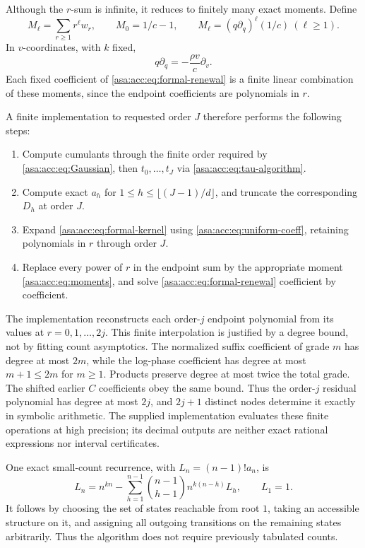 \documentclass[11pt,letterpaper]{article}
\theoremstyle{remark}\newtheorem{remark}[theorem]{Remark}
\numberwithin{equation}{section}
\begin{document}
Although the $r$-sum is infinite, it reduces to finitely many exact moments. Define
\begin{equation}\label{asa:acc:eq:moments}
M_\ell=\sum_{r\ge1}r^\ell w_r,\qquad
M_0=1/c-1,\qquad M_\ell=(q\partial_q)^\ell(1/c)\ (\ell\ge1).
\end{equation}
In $v$-coordinates, with $k$ fixed,
\begin{equation}\label{asa:acc:eq:moment-D}
q\partial_q=-\frac{\rho v}{c}\partial_v.
\end{equation}
Each fixed coefficient of \eqref{asa:acc:eq:formal-renewal} is a finite linear combination of these moments, since the endpoint coefficients are polynomials in $r$.

A finite implementation to requested order $J$ therefore performs the following steps:
\begin{enumerate}
\item Compute cumulants through the finite order required by \eqref{asa:acc:eq:Gaussian}, then $t_0,\ldots,t_J$ via \eqref{asa:acc:eq:tau-algorithm}.
\item Compute exact $a_h$ for $1\le h\le\lfloor(J-1)/d\rfloor$, and truncate the corresponding $D_h$ at order $J$.
\item Expand \eqref{asa:acc:eq:formal-kernel} using \eqref{asa:acc:eq:uniform-coeff}, retaining polynomials in $r$ through order $J$.
\item Replace every power of $r$ in the endpoint sum by the appropriate moment \eqref{asa:acc:eq:moments}, and solve \eqref{asa:acc:eq:formal-renewal} coefficient by coefficient.
\end{enumerate}
The implementation reconstructs each order-$j$ endpoint polynomial from its values at $r=0,1,\ldots,2j$. This finite interpolation is justified by a degree bound, not by fitting count asymptotics. The normalized suffix coefficient of grade $m$ has degree at most $2m$, while the log-phase coefficient has degree at most $m+1\le2m$ for $m\ge1$. Products preserve degree at most twice the total grade. The shifted earlier $C$ coefficients obey the same bound. Thus the order-$j$ residual polynomial has degree at most $2j$, and $2j+1$ distinct nodes determine it exactly in symbolic arithmetic. The supplied implementation evaluates these finite operations at high precision; its decimal outputs are neither exact rational expressions nor interval certificates.

One exact small-count recurrence, with $L_n=(n-1)!a_n$, is
\begin{equation}\label{asa:acc:eq:labelled}
L_n=n^{kn}-\sum_{h=1}^{n-1}\binom{n-1}{h-1}n^{k(n-h)}L_h,
\qquad L_1=1.
\end{equation}
It follows by choosing the set of states reachable from root $1$, taking an accessible structure on it, and assigning all outgoing transitions on the remaining states arbitrarily. Thus the algorithm does not require previously tabulated counts.
\end{document}
